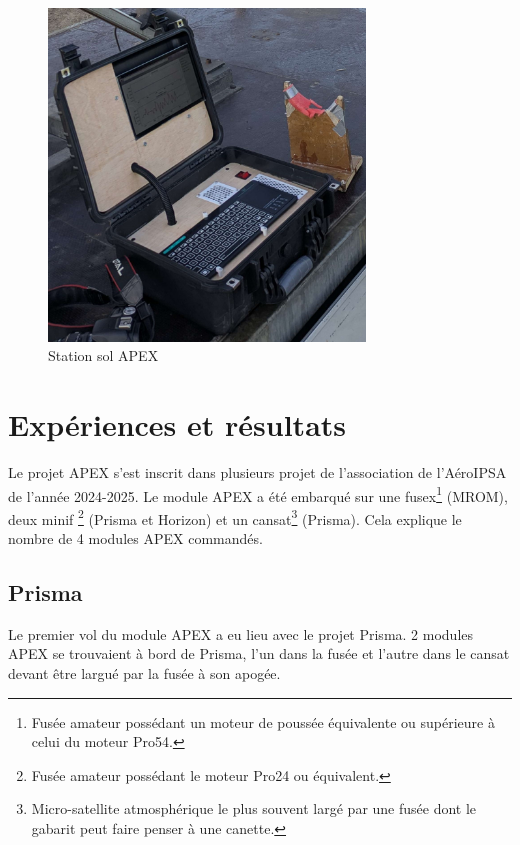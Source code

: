 \documentclass{article}
\newlength{\larg}
\begin{document}
\begin{figure}[h!]

    \centering
    \includegraphics[width=0.75\textwidth]{image/station_sol_zoom.jpg}
    \caption{Station sol APEX}
    \label{fig:station_sol_apex}

\end{figure}

\newpage

\section{Expériences et résultats}

Le projet APEX s'est inscrit dans plusieurs projet de l'association de l'AéroIPSA de
l'année 2024-2025. Le module APEX a été embarqué sur une fusex\footnote{Fusée amateur
possédant un moteur de poussée équivalente ou supérieure à celui du moteur Pro54.} (MROM),
deux minif \footnote{Fusée amateur possédant le moteur Pro24 ou équivalent.} (Prisma et
Horizon) et un cansat\footnote{Micro-satellite atmosphérique le plus souvent largé par
une fusée dont le gabarit peut faire penser à une canette.} (Prisma). Cela explique le
nombre de 4 modules APEX commandés.\\

\subsection{Prisma}

Le premier vol du module APEX a eu lieu avec le projet Prisma. 2 modules APEX se trouvaient
à bord de Prisma, l'un dans la fusée et l'autre dans le cansat devant être largué par la
fusée à son apogée.\\
\end{document}
